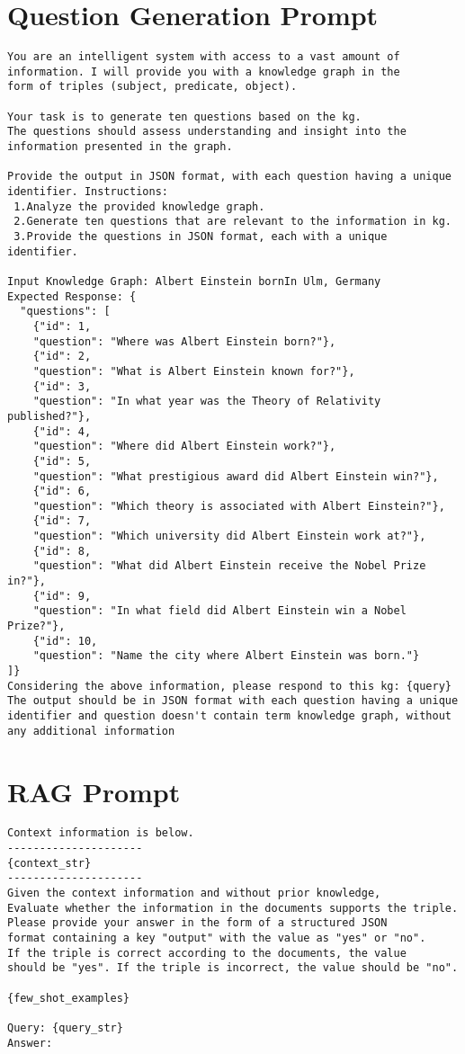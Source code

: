 \section{Question Generation Prompt}\label{sec:prompt-templates:10-question}
\begin{Verbatim}[fontsize=\small, frame=single, label={Prompt template for generating 10 questions for each triple}]
You are an intelligent system with access to a vast amount of
information. I will provide you with a knowledge graph in the
form of triples (subject, predicate, object).

Your task is to generate ten questions based on the kg.
The questions should assess understanding and insight into the
information presented in the graph.

Provide the output in JSON format, with each question having a unique
identifier. Instructions:
 1.Analyze the provided knowledge graph.
 2.Generate ten questions that are relevant to the information in kg.
 3.Provide the questions in JSON format, each with a unique identifier.

Input Knowledge Graph: Albert Einstein bornIn Ulm, Germany
Expected Response: {
  "questions": [
    {"id": 1,
    "question": "Where was Albert Einstein born?"},
    {"id": 2,
    "question": "What is Albert Einstein known for?"},
    {"id": 3,
    "question": "In what year was the Theory of Relativity published?"},
    {"id": 4,
    "question": "Where did Albert Einstein work?"},
    {"id": 5,
    "question": "What prestigious award did Albert Einstein win?"},
    {"id": 6,
    "question": "Which theory is associated with Albert Einstein?"},
    {"id": 7,
    "question": "Which university did Albert Einstein work at?"},
    {"id": 8,
    "question": "What did Albert Einstein receive the Nobel Prize in?"},
    {"id": 9,
    "question": "In what field did Albert Einstein win a Nobel Prize?"},
    {"id": 10,
    "question": "Name the city where Albert Einstein was born."}
]}
Considering the above information, please respond to this kg: {query}
The output should be in JSON format with each question having a unique
identifier and question doesn't contain term knowledge graph, without
any additional information
\end{Verbatim}

\section{RAG Prompt}\label{sec:prompt-templates:rag}
\begin{Verbatim}[fontsize=\small, frame=single, label={Prompt template for RAG}]
Context information is below.
---------------------
{context_str}
---------------------
Given the context information and without prior knowledge,
Evaluate whether the information in the documents supports the triple.
Please provide your answer in the form of a structured JSON
format containing a key "output" with the value as "yes" or "no".
If the triple is correct according to the documents, the value
should be "yes". If the triple is incorrect, the value should be "no".

{few_shot_examples}

Query: {query_str}
Answer:
\end{Verbatim}

